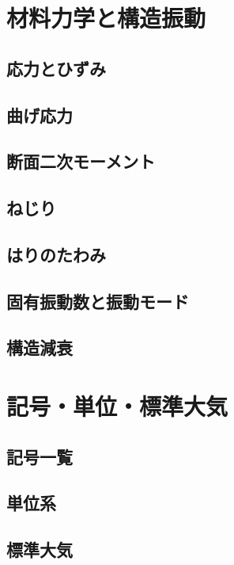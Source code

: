 \documentclass[uplatex,dvipdfmx,a4j,11pt]{jsreport}
\numberwithin{equation}{chapter}
\begin{document}
\chapter{材料力学と構造振動}

\section{応力とひずみ}

\section{曲げ応力}

\section{断面二次モーメント}

\section{ねじり}

\section{はりのたわみ}

\section{固有振動数と振動モード}

\section{構造減衰}

\chapter{記号・単位・標準大気}

\section{記号一覧}

\section{単位系}

\section{標準大気}





\end{document}
